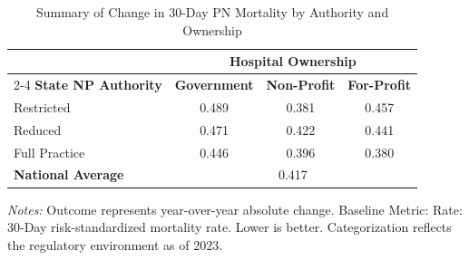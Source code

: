 \begin{table}[htbp]
    \centering
    \caption{Summary of Change in 30-Day PN Mortality by Authority and Ownership}
    \label{tab:d_mortality_rate_pn_own}
    \vspace{0.2cm}
    \begin{tabular}{lccc}
        \toprule
        & \multicolumn{3}{c}{\textbf{Hospital Ownership}} \\
        \cmidrule(lr){2-4}
        \textbf{State NP Authority} & \textbf{Government} & \textbf{Non-Profit} & \textbf{For-Profit} \\
        \midrule
        Restricted & 0.489 & 0.381 & 0.457 \\
        Reduced & 0.471 & 0.422 & 0.441 \\
        Full Practice & 0.446 & 0.396 & 0.380 \\
        \midrule
        \textbf{National Average} & \multicolumn{3}{c}{0.417} \\
        \bottomrule
    \end{tabular}
    \vspace{0.1cm}
    \begin{minipage}{0.85\textwidth}
        \footnotesize \textit{Notes:} Outcome represents year-over-year absolute change. Baseline Metric: Rate: 30-Day risk-standardized mortality rate. Lower is better. Categorization reflects the regulatory environment as of 2023.
    \end{minipage}
\end{table}